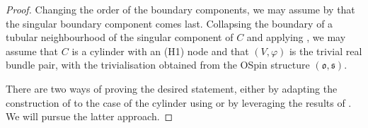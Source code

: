 \documentclass[11pt,psamsfonts, oneside, reqno]{amsart}
\newcommand{\fo}{\mathfrak{o}}
\newcommand{\fs}{\mathfrak{s}}
\theoremstyle{definition}
\theoremstyle{remark}
\numberwithin{equation}{section}
\begin{document}
\begin{proof} Changing the order of the boundary components, we may assume by \cite[CROrient~$1\fo\fs$(2)]{CZ24} that the singular boundary component comes last. Collapsing the boundary of a tubular neighbourhood of the singular component of $C$ and applying \cite[CROrient~7C(a)]{CZ24}, we may assume that $C$ is a cylinder with an (H1) node and that $(V,\varphi)$ is the trivial real bundle pair, with the trivialisation obtained from the OSpin structure $(\fo,\fs).$
	
There are two ways of proving the desired statement, either by adapting the construction of \cite[]{CZ24} to the case of the cylinder using \cite[Theorem~C.1.10]{MS12} or by leveraging the results of \cite[]{CZ24}. We will pursue the latter approach. 


\end{proof}
\end{document}
